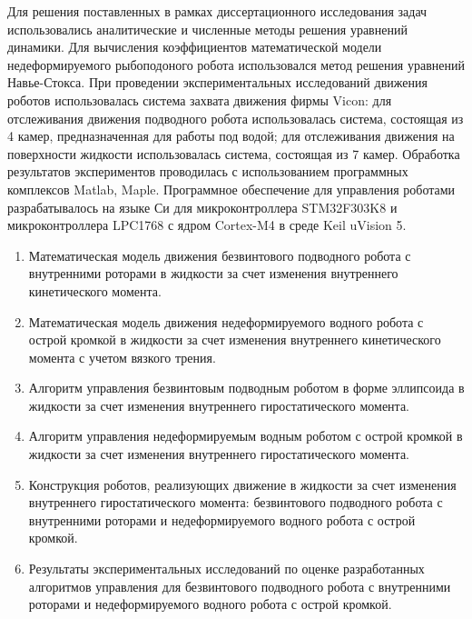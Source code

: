 {\methods} Для решения поставленных в рамках диссертационного исследования задач использовались аналитические и численные методы решения уравнений динамики. Для вычисления коэффициентов математической модели недеформируемого рыбоподоного робота использовался метод решения уравнений Навье-Стокса. При проведении экспериментальных исследований движения роботов использовалась система захвата движения фирмы Vicon: для отслеживания движения подводного робота использовалась система, состоящая из 4 камер, предназначенная для работы под водой; для отслеживания движения на поверхности жидкости использовалась система, состоящая из 7 камер. Обработка результатов экспериментов проводилась с использованием программных комплексов Matlab, Maple. Программное обеспечение для управления роботами разрабатывалось на языке Си для микроконтроллера STM32F303K8 и микроконтроллера LPC1768 с ядром Cortex-M4 в среде Keil uVision 5.

{}
\begin{enumerate}
  \item Математическая модель движения безвинтового подводного робота с внутренними роторами в жидкости за счет изменения внутреннего кинетического момента.
  \item Математическая модель движения недеформируемого водного робота с острой кромкой в жидкости за счет изменения внутреннего кинетического момента с учетом вязкого трения.
  \item Алгоритм управления безвинтовым подводным роботом в форме эллипсоида в жидкости за счет изменения внутреннего гиростатического момента.
  \item Алгоритм управления недеформируемым водным роботом с острой кромкой в жидкости за счет изменения внутреннего гиростатического момента.
  \item Конструкция роботов, реализующих движение в жидкости за счет изменения внутреннего гиростатического момента:  безвинтового подводного робота с внутренними роторами и недеформируемого водного робота с острой кромкой.
  \item Результаты экспериментальных исследований по оценке разработанных алгоритмов управления для безвинтового подводного робота с внутренними роторами и недеформируемого водного робота с острой кромкой.
  
\end{enumerate}

